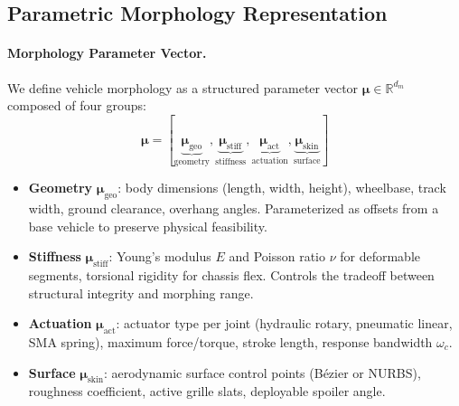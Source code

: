 \subsection{Parametric Morphology Representation}
\label{sec:morphology}

\paragraph{Morphology Parameter Vector.}
We define vehicle morphology as a structured parameter vector $\boldsymbol{\mu} \in \mathbb{R}^{d_m}$ composed of four groups:
\begin{equation}
    \boldsymbol{\mu} = [\underbrace{\boldsymbol{\mu}_\text{geo}}_{\text{geometry}}, \underbrace{\boldsymbol{\mu}_\text{stiff}}_{\text{stiffness}}, \underbrace{\boldsymbol{\mu}_\text{act}}_{\text{actuation}}, \underbrace{\boldsymbol{\mu}_\text{skin}}_{\text{surface}}]
    \label{eq:morph_params}
\end{equation}
\begin{itemize}
    \item \textbf{Geometry} $\boldsymbol{\mu}_\text{geo}$: body dimensions (length, width, height), wheelbase, track width, ground clearance, overhang angles. Parameterized as offsets from a base vehicle to preserve physical feasibility.
    \item \textbf{Stiffness} $\boldsymbol{\mu}_\text{stiff}$: Young's modulus $E$ and Poisson ratio $\nu$ for deformable segments, torsional rigidity for chassis flex. Controls the tradeoff between structural integrity and morphing range.
    \item \textbf{Actuation} $\boldsymbol{\mu}_\text{act}$: actuator type per joint (hydraulic rotary, pneumatic linear, SMA spring), maximum force/torque, stroke length, response bandwidth $\omega_c$.
    \item \textbf{Surface} $\boldsymbol{\mu}_\text{skin}$: aerodynamic surface control points (Bézier or NURBS), roughness coefficient, active grille slats, deployable spoiler angle.
\end{itemize}

